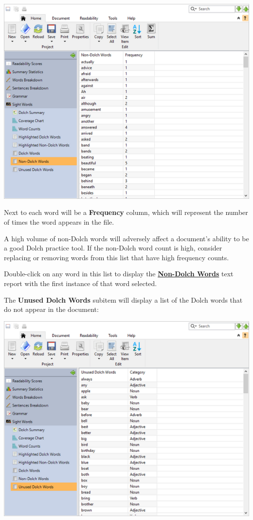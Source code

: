 \documentclass[
]{book}
\theoremstyle{definition}
\theoremstyle{definition}
\theoremstyle{definition}
\theoremstyle{definition}
\theoremstyle{remark}
\begin{document}
\includegraphics{Images/dolchnonwordslist.png}

Next to each word will be a \textbf{Frequency} column, which will represent the number of times the word appears in the file.

A high volume of non-Dolch words will adversely affect a document's ability to be a good Dolch practice tool. If the non-Dolch word count is high, consider replacing or removing words from this list that have high frequency counts.

Double-click on any word in this list to display the \protect\hyperlink{reviewing-dolch-text}{\textbf{Non-Dolch Words}} text report with the first instance of that word selected.

The \textbf{Unused Dolch Words} subitem will display a list of the Dolch words that do not appear in the document:

\includegraphics{Images/dolchunusedwordslist.png}
\end{document}
